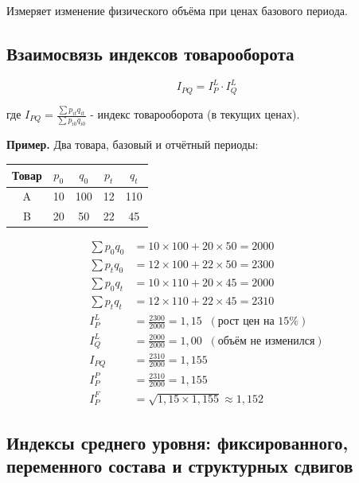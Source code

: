 \documentclass[a4paper]{article}
\begin{document}
Измеряет изменение физического объёма при ценах базового периода.

\subsection{Взаимосвязь индексов товарооборота}

\begin{equation}
	I_{PQ} = I_P^L \cdot I_Q^L
\end{equation}

где $\displaystyle I_{PQ} = \frac{\sum p_{it} q_{it}}{\sum p_{i0} q_{i0}}$ -
индекс товарооборота (в текущих ценах).


	\textbf{Пример.} Два товара, базовый и отчётный периоды:
	\begin{center}
		\begin{tabular}{ccccc}
			\toprule
			Товар & $p_0$ & $q_0$ & $p_t$ & $q_t$ \\
			\midrule
			A & 10 & 100 & 12 & 110 \\
			B & 20 &  50 & 22 &  45 \\
			\bottomrule
		\end{tabular}
	\end{center}
	\begin{align*}
		\sum p_0 q_0 &= 10 \times 100 + 20 \times 50 = 2000 \\
		\sum p_t q_0 &= 12 \times 100 + 22 \times 50 = 2300 \\
		\sum p_0 q_t &= 10 \times 110 + 20 \times 45 = 2000 \\
		\sum p_t q_t &= 12 \times 110 + 22 \times 45 = 2310 \\[6pt]
		I_P^L &= \frac{2300}{2000} = 1{,}15 \;\; (\text{рост цен на } 15\%) \\
		I_Q^L &= \frac{2000}{2000} = 1{,}00 \;\; (\text{объём не изменился}) \\
		I_{PQ} &= \frac{2310}{2000} = 1{,}155 \\
		I_P^P &= \frac{2310}{2000} = 1{,}155 \\
		I_P^F &= \sqrt{1{,}15 \times 1{,}155} \approx 1{,}152
	\end{align*}


\subsection{Индексы среднего уровня: фиксированного, переменного состава
	и структурных сдвигов}
\end{document}
